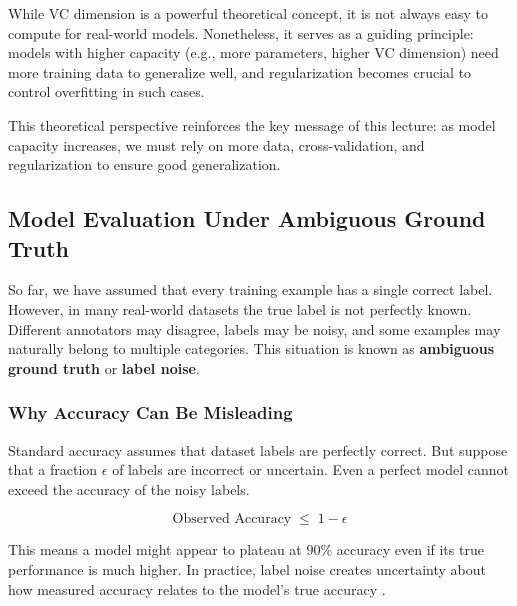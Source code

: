 \documentclass{article}
\begin{document}
While VC dimension is a powerful theoretical concept, it is not always easy to compute for real-world models. Nonetheless, it serves as a guiding principle: models with higher capacity (e.g., more parameters, higher VC dimension) need more training data to generalize well, and regularization becomes crucial to control overfitting in such cases.

This theoretical perspective reinforces the key message of this lecture: 
as model capacity increases, we must rely on more data, cross-validation, 
and regularization to ensure good generalization.



\subsection{Model Evaluation Under Ambiguous Ground Truth}

So far, we have assumed that every training example has a single correct label. 
However, in many real-world datasets the true label is not perfectly known. 
Different annotators may disagree, labels may be noisy, and some examples may 
naturally belong to multiple categories. This situation is known as 
\textbf{ambiguous ground truth} or \textbf{label noise}.

\subsubsection{Why Accuracy Can Be Misleading}

Standard accuracy assumes that dataset labels are perfectly correct. 
But suppose that a fraction $\epsilon$ of labels are incorrect or uncertain. 
Even a perfect model cannot exceed the accuracy of the noisy labels.

\[
\boxed{
\text{Observed Accuracy} \;\le\; 1 - \epsilon
}
\]

This means a model might appear to plateau at $90\%$ accuracy even if its 
true performance is much higher. In practice, label noise creates uncertainty 
about how measured accuracy relates to the model's true accuracy 
\cite{DBLP:journals/corr/abs-1908-07086, Quesada2025Largescale}.
\end{document}
